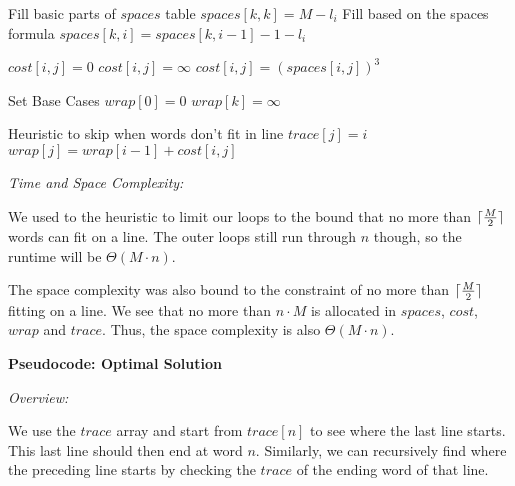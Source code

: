 \documentclass[a4paper]{report}
\DeclarePairedDelimiter{\ceil}{\lceil}{\rceil}
\begin{document}
\begin{enumerate}
\begin{algorithmic}[1]
          \Comment Fill basic parts of $spaces$ table
            \State $spaces[k,k] = M - l_{i}$
            \Comment Fill based on the spaces formula 
              \State $spaces[k,i] = spaces[k, i-1] - 1 - l_{i}$
            \EndFor
          \EndFor

                \State $cost[i,j] = 0$
                \State $cost[i,j] = \infty$
              \Else
                \State $cost[i,j] = (spaces[i,j])^3$
              \EndIf
            \EndFor
          \EndFor

          \Comment Set Base Cases
          \State $wrap[0]=0$
            \State $wrap[k] = \infty$
          \EndFor

            \Comment Heuristic to skip when words don't fit in line
                \State $trace[j] = i$
                \State $wrap[j] = wrap[i-1] + cost[i,j]$
              \EndIf
            \EndFor
          \EndFor


        \EndFunction
      \end{algorithmic}
      
      {\it Time and Space Complexity:}

      We used to the heuristic to limit our loops to the bound that no more than $\ceil{\frac{M}{2}}$ words can fit on 
      a line. The outer loops still run through $n$ though, so the runtime will be $\Theta(M \cdot n)$.

      The space complexity was also bound to the constraint of no more than $\ceil{\frac{M}{2}}$ fitting on a line. We see
      that no more than $n \cdot M$ is allocated in $spaces$, $cost$, $wrap$ and $trace$. Thus, the space complexity is
      also $\Theta(M \cdot n)$.


      {\bf Pseudocode: Optimal Solution}

      {\it Overview:}

      We use the $trace$ array and start from $trace[n]$ to see where the last line starts. This last line should then end
      at word $n$. Similarly, we can recursively find where the preceding line starts by checking the $trace$ of the 
      ending word of that line.


\end{enumerate}
\end{document}
